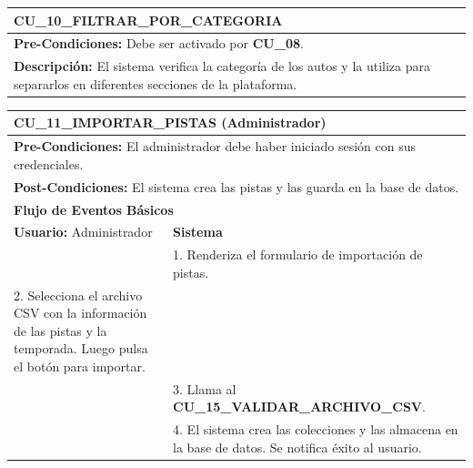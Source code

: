 \begin{center}
  \begin{tabular}{| p{7.5cm} | p{7.5cm} |}
    \hline
    \multicolumn{2}{|p{15cm}|}{\textbf{CU\_10\_FILTRAR\_POR\_CATEGORIA}} \\ \hline
    \multicolumn{2}{|p{15cm}|}{\textbf{Pre-Condiciones:} Debe ser activado por \textbf{CU\_08}.} \\ \hline
    \multicolumn{2}{|p{15cm}|}{\textbf{Descripción:} El sistema verifica la categoría de los autos y la utiliza para separarlos en diferentes secciones de la plataforma.} \\
    \hline
  \end{tabular}
\end{center}

%
%

\begin{center}
  \begin{tabular}{| p{7.5cm} | p{7.5cm} |}
    \hline
    \multicolumn{2}{|p{15cm}|}{\textbf{CU\_11\_IMPORTAR\_PISTAS} (Administrador)} \\ \hline
    \multicolumn{2}{|p{15cm}|}{\textbf{Pre-Condiciones:} El administrador debe haber iniciado sesión con sus credenciales.} \\ \hline
    \multicolumn{2}{|p{15cm}|}{\textbf{Post-Condiciones:} El sistema crea las pistas y las guarda en la base de datos.} \\ \hline
    \multicolumn{2}{|p{7.5cm}|}{\textbf{Flujo de Eventos Básicos}} \\ \hline
    \multicolumn{1}{|p{7.5cm}|}{\textbf{Usuario:} Administrador} & \multicolumn{1}{|p{7.5cm}|}{\textbf{Sistema}} \\ \hline
    
    \multicolumn{1}{|p{7.5cm}|}{} & 
    \multicolumn{1}{|p{7.5cm}|}{1. Renderiza el formulario de importación de pistas.}\\ \hline
    
    \multicolumn{1}{|p{7.5cm}|}{2. Selecciona el archivo CSV con la información de las pistas y la temporada. Luego pulsa el botón para importar.}& 
    \multicolumn{1}{|p{7.5cm}|}{}\\ \hline
    
    \multicolumn{1}{|p{7.5cm}|}{}& 
    \multicolumn{1}{|p{7.5cm}|}{3. Llama al \textbf{CU\_15\_VALIDAR\_ARCHIVO\_CSV}.}\\ \hline
    
    \multicolumn{1}{|p{7.5cm}|}{} & 
    \multicolumn{1}{|p{7.5cm}|}{4. El sistema crea las colecciones y las almacena en la base de datos. Se notifica éxito al usuario.}\\ \hline
    

\end{tabular}
\end{center}
